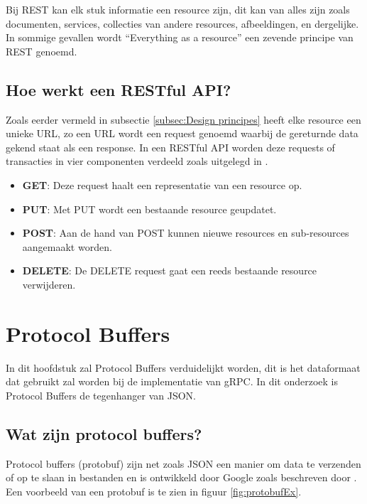 Bij REST kan elk stuk informatie een resource zijn, dit kan van alles zijn zoals documenten, services, collecties van andere resources, afbeeldingen, en dergelijke. In sommige gevallen wordt “Everything as a resource”  een zevende principe van REST genoemd. 

\subsection{Hoe werkt een RESTful API?}
\label{subsec:Hoe werkt een RESTful API?}

Zoals eerder vermeld in subsectie \ref{subsec:Design principes} heeft elke resource een unieke URL, zo een URL wordt een request genoemd waarbij de gereturnde data gekend staat als een response. In een RESTful API worden deze requests of transacties in vier componenten verdeeld zoals uitgelegd in \textcite{Karine2020}.

\begin{itemize}
    \item \textbf{GET}: Deze request haalt een representatie van een resource op.
    \item \textbf{PUT}: Met PUT wordt een bestaande resource geupdatet.
    \item \textbf{POST}: Aan de hand van POST kunnen nieuwe resources en sub-resources aangemaakt worden.
    \item \textbf{DELETE}: De DELETE request gaat een reeds bestaande resource verwijderen.
\end{itemize}

\section{Protocol Buffers}
\label{sec:Protocol Buffers}

 In dit hoofdstuk zal Protocol Buffers verduidelijkt worden, dit is het dataformaat dat gebruikt zal worden bij de implementatie van gRPC. In dit onderzoek is Protocol Buffers de tegenhanger van JSON.

\subsection{Wat zijn protocol buffers?}
\label{subsec:Wat zijn protocol buffers?}

Protocol buffers (protobuf) zijn net zoals JSON een manier om data te verzenden of op te slaan in bestanden en is ontwikkeld door Google zoals beschreven door \textcite{Kurian2020}. Een voorbeeld van een protobuf is te zien in figuur \ref{fig:protobufEx}.

